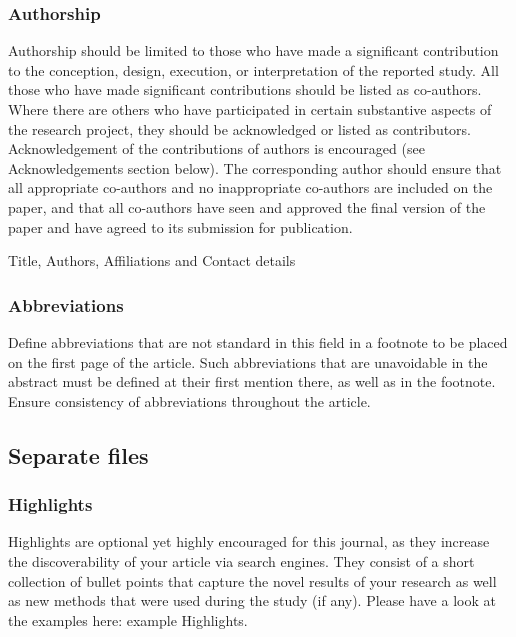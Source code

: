 \documentclass[
  number]{elsarticle}
\begin{document}
\hypertarget{authorship}{%
\subsubsection{Authorship}\label{authorship}}

Authorship should be limited to those who have made a significant
contribution to the conception, design, execution, or interpretation of
the reported study. All those who have made significant contributions
should be listed as co-authors. Where there are others who have
participated in certain substantive aspects of the research project,
they should be acknowledged or listed as contributors. Acknowledgement
of the contributions of authors is encouraged (see Acknowledgements
section below). The corresponding author should ensure that all
appropriate co-authors and no inappropriate co-authors are included on
the paper, and that all co-authors have seen and approved the final
version of the paper and have agreed to its submission for publication.

Title, Authors, Affiliations and Contact details

\hypertarget{abbreviations}{%
\subsubsection{Abbreviations}\label{abbreviations}}

Define abbreviations that are not standard in this field in a footnote
to be placed on the first page of the article. Such abbreviations that
are unavoidable in the abstract must be defined at their first mention
there, as well as in the footnote. Ensure consistency of abbreviations
throughout the article.

\hypertarget{separate-files}{%
\subsection{Separate files}\label{separate-files}}

\hypertarget{highlights}{%
\subsubsection{Highlights}\label{highlights}}

Highlights are optional yet highly encouraged for this journal, as they
increase the discoverability of your article via search engines. They
consist of a short collection of bullet points that capture the novel
results of your research as well as new methods that were used during
the study (if any). Please have a look at the examples here: example
Highlights.
\end{document}
